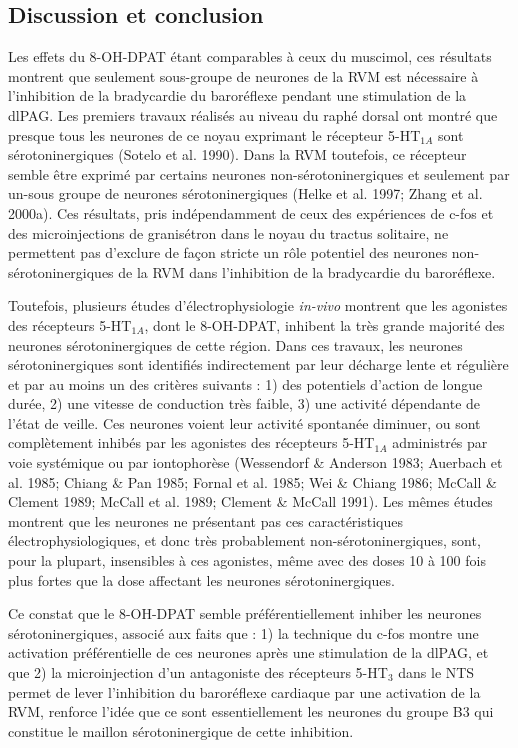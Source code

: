 \documentclass[a4paper,12pt,twoside]{report}
\begin{document}
\subsection{Discussion et conclusion}

Les effets du 8-OH-DPAT étant comparables à ceux du muscimol, ces résultats montrent que seulement sous-groupe de neurones de la RVM est nécessaire à l’inhibition de la bradycardie du baroréflexe pendant une stimulation de la dlPAG. Les premiers travaux réalisés au niveau du raphé dorsal ont montré que presque tous les neurones de ce noyau exprimant le récepteur 5-HT$_{1A}$ sont sérotoninergiques (Sotelo et al. 1990). Dans la RVM toutefois, ce récepteur semble être exprimé par certains neurones non-sérotoninergiques et seulement par un-sous groupe de neurones sérotoninergiques (Helke et al. 1997; Zhang et al. 2000a). Ces résultats, pris indépendamment de ceux des expériences de c-fos et des microinjections de granisétron dans le noyau du tractus solitaire, ne permettent pas d’exclure de façon stricte un rôle potentiel des neurones non-sérotoninergiques de la RVM dans l’inhibition de la bradycardie du baroréflexe. 

Toutefois, plusieurs études d’électrophysiologie \textit{in-vivo} montrent que les agonistes des récepteurs 5-HT$_{1A}$, dont le 8-OH-DPAT, inhibent la très grande majorité des neurones sérotoninergiques de cette région. Dans ces travaux, les neurones sérotoninergiques sont identifiés indirectement par leur décharge lente et régulière et par au moins un des critères suivants : 1) des potentiels d’action de longue durée, 2) une vitesse de conduction très faible, 3) une activité dépendante de l’état de veille. Ces neurones voient leur activité spontanée diminuer, ou sont complètement inhibés par les agonistes des récepteurs 5-HT$_{1A}$ administrés par voie systémique ou par iontophorèse (Wessendorf \& Anderson 1983; Auerbach et al. 1985; Chiang \& Pan 1985; Fornal et al. 1985; Wei \& Chiang 1986; McCall \& Clement 1989; McCall et al. 1989; Clement \& McCall 1991). Les mêmes études montrent que les neurones ne présentant pas ces caractéristiques électrophysiologiques, et donc très probablement non-sérotoninergiques, sont, pour la plupart, insensibles à ces agonistes, même avec des doses 10 à 100 fois plus fortes que la dose affectant les neurones sérotoninergiques.

Ce constat que le 8-OH-DPAT semble préférentiellement inhiber les neurones sérotoninergiques, associé aux faits que : 1) la technique du c-fos montre une activation préférentielle de ces neurones après une stimulation de la dlPAG, et que 2) la microinjection d’un antagoniste des récepteurs 5-HT$_{3}$ dans le NTS permet de lever l’inhibition du baroréflexe cardiaque par une activation de la RVM, renforce l’idée que ce sont essentiellement les neurones du groupe B3 qui constitue le maillon sérotoninergique de cette inhibition.
\end{document}
